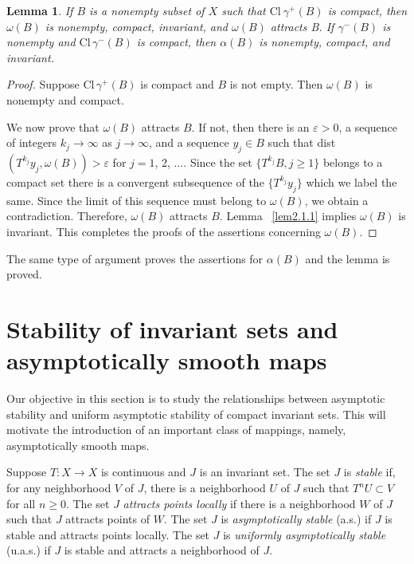 \documentclass{surv-l}
\theoremstyle{plain}
\newtheorem{lemma}[theorem]{Lemma}
\theoremstyle{definition}
\numberwithin{equation}{section}
\numberwithin{figure}{chapter}
\begin{document}
\begin{lemma}\label{lem2.1.2}
If $B$ is a nonempty subset of $X$ such that $\mathrm{Cl}\ \gamma^{+}(B)$ is compact, then $\omega(B)$ is nonempty, compact, invariant, and $\omega(B)$ attracts B. If $\gamma^{-}(B)$ is nonempty and $\mathrm{Cl}\,\gamma^{-}(B)$ is compact, then $\alpha(B)$ is nonempty, compact, and invariant.
\end{lemma}

\begin{proof}
Suppose $\mathrm{Cl}\,\gamma^{+}(B)$ is compact and $B$ is not empty. Then $\omega(B)$ is nonempty and compact.

We now prove that $\omega(B)$ attracts $B$. If not, then there is an $\varepsilon >0$, a sequence of integers $ k_{j}\rightarrow\infty$ as $ j\rightarrow\infty$, and a sequence $y_{j}\in B$ such that dist$(T^{k_{j}}y_{j}, \omega(B))>\varepsilon$ for $j=1$, 2, $\ldots.$ Since the set $\{T^{k_{j}} B, j\geq 1\}$ belongs to a compact set there is a convergent subsequence of the $\{T^{k_{j}}y_{j}\}$ which we label the same. Since the limit of this sequence must belong to $\omega(B)$, we obtain a contradiction. Therefore, $\omega(B)$ attracts $B$. Lemma ~\ref{lem2.1.1} implies $\omega(B)$ is invariant. This completes the proofs of the assertions concerning $\omega(B)$.
\end{proof}
The same type of argument proves the assertions for $\alpha(B)$ and the lemma is proved.


\section{Stability of invariant sets and asymptotically smooth maps}\label{sec2.2}

Our objective in this section is to study the relationships between asymptotic stability and uniform asymptotic stability of compact invariant sets. This will motivate the introduction of an important class of mappings, namely, asymptotically smooth maps.

Suppose $T\!:X\rightarrow X$ is continuous and $J$ is an invariant set. The set $J$ is \emph{stable} if, for any neighborhood $V$ of $J$, there is a neighborhood $U$ of $J$ such that $T^{n}U\subset V$ for all $n\geq 0$. The set $J$ \emph{attracts points locally} if there is a neighborhood $W$ of $J$ such that $J$ attracts points of $W$. The set $J$ is \emph{asymptotically stable} (a.s.) if $J$ is stable and attracts points locally. The set $J$ is \emph{uniformly asymptotically stable} (u.a.s.) if $J$ is stable and attracts a neighborhood of $J$.
\end{document}
